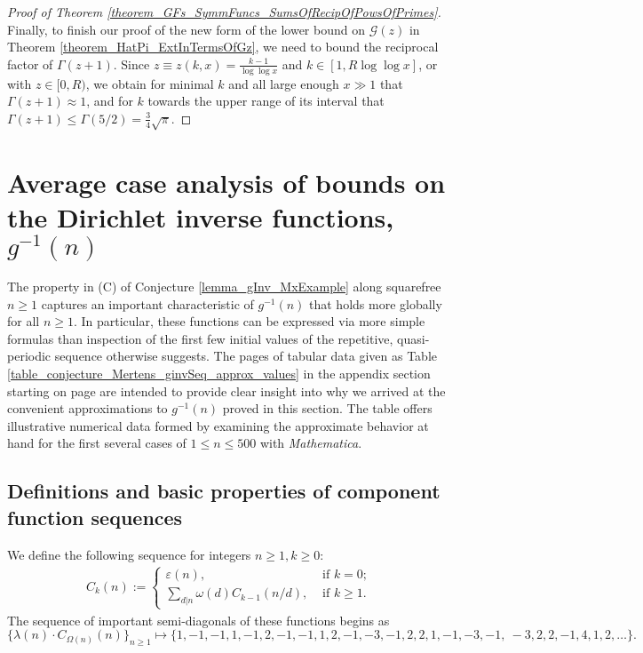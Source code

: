 \documentclass[11pt,reqno,a4letter]{article}
\numberwithin{figure}{section}
\numberwithin{table}{section}
\newcommand{\seqnum}[1]{\href{http://oeis.org/#1}{\color{ProcessBlue}{\underline{#1}}}}
\theoremstyle{plain}
\numberwithin{theorem}{section}
\theoremstyle{definition}
\begin{document}
\begin{proof}[Proof of Theorem \ref{theorem_GFs_SymmFuncs_SumsOfRecipOfPowsOfPrimes}]
Finally, to finish our proof of the new form of the lower bound on $\mathcal{G}(z)$ in 
Theorem \ref{theorem_HatPi_ExtInTermsOfGz}, 
we need to bound the reciprocal factor of $\Gamma(z+1)$. 
Since $z \equiv z(k, x) = \frac{k-1}{\log\log x}$ and 
$k \in [1, R\log\log x]$, or with $z \in [0, R)$, 
we obtain for minimal $k$ and all large enough $x \gg 1$ that 
$\Gamma(z+1) \approx 1$, and for $k$ towards the upper range of 
its interval that $\Gamma(z+1) \leq \Gamma(5/2) = \frac{3}{4} \sqrt{\pi}$. 
\end{proof} 

\newpage
\section{Average case analysis of bounds on the Dirichlet inverse functions, $g^{-1}(n)$} 
\label{Section_InvFunc_PreciseExpsAndAsymptotics} 

The property in (C) of 
Conjecture \ref{lemma_gInv_MxExample} along squarefree $n \geq 1$ 
captures an important characteristic of $g^{-1}(n)$ that holds more globally 
for all $n \geq 1$. In particular, these 
functions can be expressed via more simple formulas than inspection of the 
first few initial values of the repetitive, quasi-periodic sequence otherwise suggests. 
The pages of tabular data given as Table \ref{table_conjecture_Mertens_ginvSeq_approx_values} 
in the appendix section starting on 
page \pageref{table_conjecture_Mertens_ginvSeq_approx_values} are intended to 
provide clear insight into why we arrived at the convenient approximations to 
$g^{-1}(n)$ proved in this section. The table offers illustrative 
numerical data formed by examining the approximate behavior 
at hand for the first several cases of $1 \leq n \leq 500$ with \emph{Mathematica}. 

\subsection{Definitions and basic properties of component function sequences} 

We define the following sequence for integers $n \geq 1, k \geq 0$: 
\begin{align} 
\label{eqn_CknFuncDef_v2} 
C_k(n) := \begin{cases} 
     \varepsilon(n), & \text{ if $k = 0$; } \\ 
     \sum\limits_{d|n} \omega(d) C_{k-1}(n/d), & \text{ if $k \geq 1$. } 
     \end{cases} 
\end{align} 
The sequence of important semi-diagonals of these functions begins as 
\cite[\seqnum{A008480}]{OEIS} 
\[
\{\lambda(n) \cdot C_{\Omega(n)}(n) \}_{n \geq 1} \mapsto \{
     1, -1, -1, 1, -1, 2, -1, -1, 1, 2, -1, -3, -1, 2, 2, 1, -1, -3, -1, \
     -3, 2, 2, -1, 4, 1, 2, \ldots \}. 
\]
\end{document}

